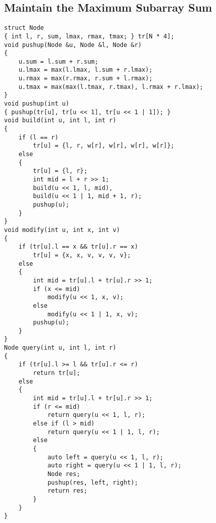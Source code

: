 \subsection{Maintain the Maximum Subarray Sum}
\begin{lstlisting}
struct Node
{ int l, r, sum, lmax, rmax, tmax; } tr[N * 4];
void pushup(Node &u, Node &l, Node &r)
{
    u.sum = l.sum + r.sum;
    u.lmax = max(l.lmax, l.sum + r.lmax);
    u.rmax = max(r.rmax, r.sum + l.rmax);
    u.tmax = max(max(l.tmax, r.tmax), l.rmax + r.lmax);
}
void pushup(int u)
{ pushup(tr[u], tr[u << 1], tr[u << 1 | 1]); }
void build(int u, int l, int r)
{
    if (l == r)
        tr[u] = {l, r, w[r], w[r], w[r], w[r]};
    else
    {
        tr[u] = {l, r};
        int mid = l + r >> 1;
        build(u << 1, l, mid), 
        build(u << 1 | 1, mid + 1, r);
        pushup(u);
    }
}
void modify(int u, int x, int v)
{
    if (tr[u].l == x && tr[u].r == x)
        tr[u] = {x, x, v, v, v, v};
    else
    {
        int mid = tr[u].l + tr[u].r >> 1;
        if (x <= mid)
            modify(u << 1, x, v);
        else
            modify(u << 1 | 1, x, v);
        pushup(u);
    }
}
Node query(int u, int l, int r)
{
    if (tr[u].l >= l && tr[u].r <= r)
        return tr[u];
    else
    {
        int mid = tr[u].l + tr[u].r >> 1;
        if (r <= mid)
            return query(u << 1, l, r);
        else if (l > mid)
            return query(u << 1 | 1, l, r);
        else
        {
            auto left = query(u << 1, l, r);
            auto right = query(u << 1 | 1, l, r);
            Node res;
            pushup(res, left, right);
            return res;
        }
    }
}
\end{lstlisting}
